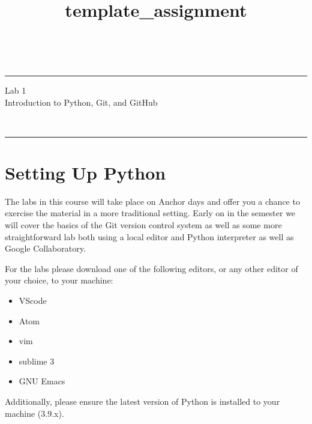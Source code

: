 \documentclass[a4paper,10pt]{article} %
\begin{document}

\title{template_assignment} %
\fancyhead[C]{}
\begin{minipage}{0.295\textwidth} %
\raggedright
\hfill\\ %
\medskip\hrule
\end{minipage}
\begin{minipage}{0.4\textwidth} %
\centering 
\large %
Lab 1\\ %
\normalsize %
Introduction to Python, Git, and GitHub\\
\end{minipage}
\begin{minipage}{0.295\textwidth} %
\raggedleft
\hfill\\ %
\medskip\hrule
\end{minipage}

\bigskip

\printbibliography

\section{Setting Up Python}

The labs in this course will take place on Anchor days and offer you a chance
to exercise the material in a more traditional setting. Early on in the
semester we will cover the basics of the Git version control system as well as
some more straightforward lab both using a local editor and Python interpreter
as well as Google Collaboratory.

For the labs please download one of the following editors, or any other editor
of your choice, to your machine:

\begin{itemize}
  \item VScode
  \item Atom
  \item vim
  \item sublime 3
  \item GNU Emacs
\end{itemize}

Additionally, please ensure the latest version of Python is installed to your
machine (3.9.x).
\end{document}
